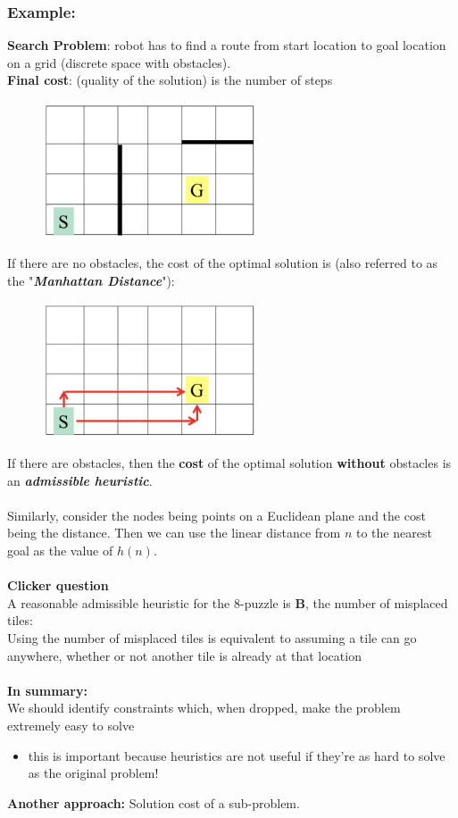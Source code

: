 \documentclass{article}
\theoremstyle{definition}
\begin{document}
\subsubsection*{Example:}
\textbf{Search Problem}: robot has to find a route from start location to goal location on a grid (discrete space with obstacles). \\
\textbf{Final cost}: (quality of the solution) is the number of steps
 \begin{figure}[H]
	\centering
	\includegraphics[width = 2.5in]{Pic2}
\end{figure}
\noindent If there are no obstacles, the cost of the optimal solution is (also referred to as the "\textbf{\textit{Manhattan Distance}}"):
\begin{figure}[H]
	\centering
	\includegraphics[width = 2.5in]{Pic3}
\end{figure}
\noindent If there are obstacles, then the \textbf{\color{blue} cost} of the optimal solution \textbf{\color{blue} without} obstacles is an \textit{\textbf{\color{blue} admissible heuristic}}. \\ \\
Similarly, consider the nodes being {\color{Magenta} points on a Euclidean plane} and the cost being the distance. Then we can use the linear distance from $ n $ to the nearest goal as the value of $ h(n) $. \\ \\
\textbf{\color{Dandelion} Clicker question}\\A reasonable admissible heuristic for the 8-puzzle is \textbf{\color{Dandelion} B}, the number of misplaced tiles: \\
Using the number of misplaced tiles is equivalent to assuming a tile can go anywhere, whether or not another tile is already at that location \\ \\
\textbf{In summary:} \\
We should identify constraints which, when dropped, make the problem extremely easy to solve
\begin{itemize}
	\item this is important because heuristics are not useful
if they're as hard to solve as the original problem!
\end{itemize}
\textbf{Another approach:} Solution cost of a sub-problem.
\end{document}
